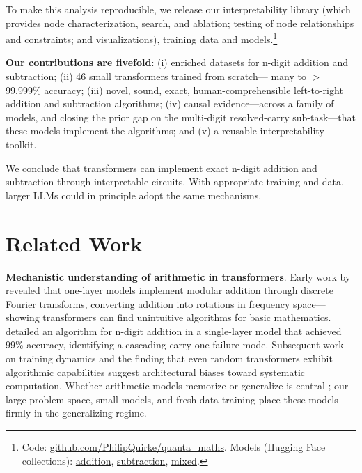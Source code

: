 \documentclass[11pt]{article}
\begin{document}
To make this analysis reproducible, we release our interpretability library (which
provides node characterization, search, and ablation; testing of node relationships and constraints; and visualizations),
training data and models.\footnote{Code: \href{https://github.com/PhilipQuirke/quanta_maths}{github.com/PhilipQuirke/quanta\_maths}.
Models (Hugging Face collections):
\href{https://huggingface.co/collections/PhilipQuirke/quantamaths-addition-models}{addition},
\href{https://huggingface.co/collections/PhilipQuirke/quantamaths-subtraction-models}{subtraction},
\href{https://huggingface.co/collections/PhilipQuirke/quantamaths-mixed-models}{mixed}.}

\textbf{Our contributions are fivefold}: (i) enriched datasets for n-digit addition and subtraction; (ii) 46 small transformers trained from 
scratch--- many to $>$99.999\% accuracy; (iii) novel, sound, exact, human-comprehensible left-to-right addition and subtraction algorithms; (iv) causal 
evidence---across a family of models, and closing the prior gap on the multi-digit resolved-carry sub-task---that these models implement the 
algorithms; and (v) a reusable interpretability toolkit.

We conclude that transformers can implement exact n-digit addition and subtraction through interpretable circuits. 
With appropriate training and data, larger LLMs could in principle adopt the same mechanisms.

\section{Related Work}
\label{sec:RelatedWork}

\textbf{Mechanistic understanding of arithmetic in transformers}. Early work by \citet{nanda2023progress} revealed that one-layer models
implement modular addition through discrete Fourier transforms, converting addition into rotations in frequency space---showing transformers
can find unintuitive algorithms for basic mathematics. \citet{quirke2023understanding} detailed an algorithm for n-digit addition in a
single-layer model that achieved 99\% accuracy, identifying a cascading carry-one failure mode. Subsequent work on training dynamics
\citep{musat2024clusteringalignmentunderstandingtraining} and the finding that even random transformers exhibit algorithmic capabilities
\citep{zhong2024algorithmiccapabilitiesrandomtransformers} suggest architectural biases toward systematic computation. Whether arithmetic
models memorize or generalize is central \citep{mahdavi2024memorization,michaud2023quantization}; our large problem space, small models, and
fresh-data training place these models firmly in the generalizing regime.
\end{document}
